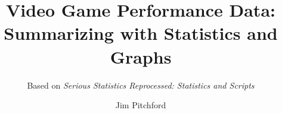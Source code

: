 \documentclass[aspectratio=43, 10.5pt, t, handout]{beamer}
\title{Video Game Performance Data:\newline
Summarizing with Statistics and Graphs}
\author{Jim Pitchford}
\subtitle{\footnotesize	Based on \textit{Serious Statistics Reprocessed: Statistics and Scripts}}
\begin{document}
\graphicspath{{Media/}}

\begin{frame}
	\maketitle
\end{frame}














\end{document}
